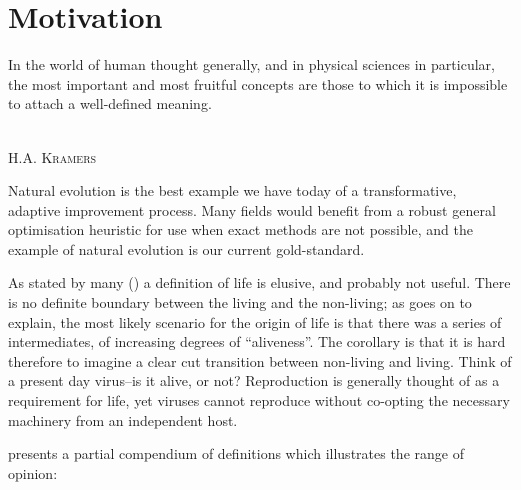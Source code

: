 \section{Motivation}

\epigraph{%
In the world of human thought generally, and in physical sciences in particular, the most important and most fruitful concepts are those to which it is impossible to attach a well-defined meaning.}%
{\textsc{\\H.A. Kramers}}

Natural evolution is the best example we have today of a transformative, adaptive improvement process. Many fields would benefit from a robust general optimisation heuristic for use when exact methods are not possible, and the example of natural evolution is our current gold-standard. 

As stated by many (\eg \cite{Pascal2013, Malaterre2015}) a definition of life is elusive, and probably not useful. There is no definite boundary between the living and the non-living; as \parencite{Pascal2013} goes on to explain, the most likely scenario for the origin of life is that there was a series of intermediates, of increasing degrees of ``aliveness''. The corollary is that it is hard therefore to imagine a clear cut transition between non-living and living. Think of a present day virus--is it alive, or not? Reproduction is generally thought of as a requirement for life, yet viruses cannot reproduce without co-opting the necessary machinery from an independent host. 

\parencite{Fernando:2007pf} presents a partial compendium of definitions which illustrates the range of opinion:


